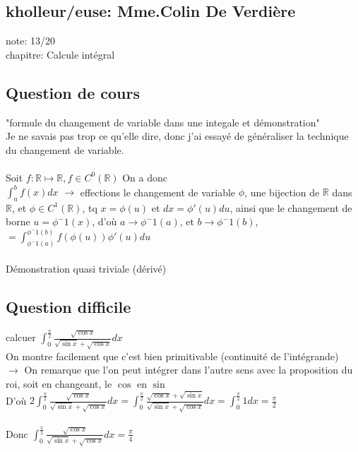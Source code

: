 \documentclass{article}
\begin{document}
\subsection{kholleur/euse: Mme.Colin De Verdière}

note: 13/20 \\
chapitre: Calcule intégral

\subsection{Question de cours}

"formule du changement de variable dans une integale et démonstration" \\
Je ne savais pas trop ce qu'elle dire, donc j'ai essayé de généraliser la technique du changement de variable. \\ \\

Soit $f: \mathbb{R} \mapsto \mathbb{R}, f \in C^0(\mathbb{R})$ On a donc \\
$\int_a^b f(x) dx$ \hspace{1cm} $\rightarrow$ \hspace{0.2cm} effections le changement de variable $\phi$, une bijection de $\mathbb{R}$ dans $\mathbb{R}$, et $\phi \in C^1(\mathbb{R})$, tq $x = \phi(u)$ et $dx = \phi'(u)du$, ainsi que le changement de borne $u = \phi^-1(x)$, d'où $a \rightarrow \phi^-1(a)$, et $b \rightarrow \phi^-1(b)$,\\
$=\int_{\phi^-1(a)}^{\phi^-1(b)} f(\phi(u)) \phi'(u) du$ \\ \\

Démonstration quasi triviale (dérivé)
\subsection{Question difficile}

calcuer $\int_0^{\frac{\pi}{2}} \frac{\sqrt{\cos x}}{\sqrt{\sin x} + \sqrt{\cos x}} dx$ \\

On montre facilement que c'est bien primitivable (continuité de  l'intégrande) \\

\hspace{1cm} $\rightarrow$ On remarque que l'on peut intégrer dans l'autre sens avec la proposition du roi, soit en changeant, le $\cos$ en $\sin$ \\

D'où $2\int_0^{\frac{\pi}{2}} \frac{\sqrt{\cos x}}{\sqrt{\sin x} + \sqrt{\cos x}} dx = \int_0^{\frac{\pi}{2}} \frac{\sqrt{\cos x} + \sqrt{\sin x}}{\sqrt{\sin x} + \sqrt{\cos x}} dx = \int_0^{\frac{\pi}{2}} 1 dx = \frac{\pi}{2}$ \\ \\
Donc $\int_0^{\frac{\pi}{2}} \frac{\sqrt{\cos x}}{\sqrt{\sin x} + \sqrt{\cos x}} dx = \frac{\pi}{4}$ 
\end{document}
